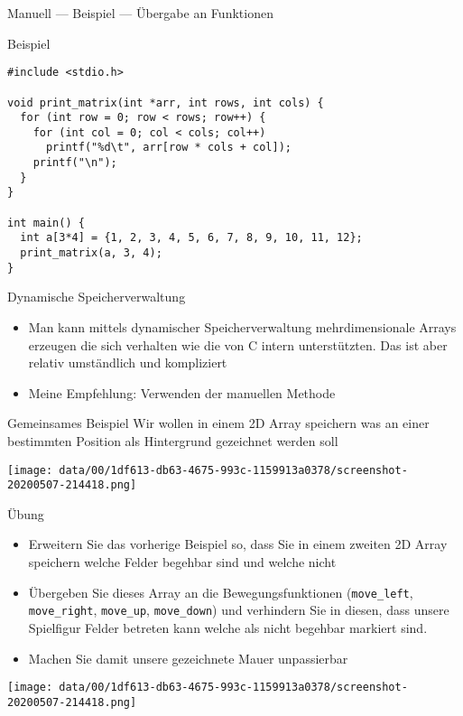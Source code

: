 \documentclass[presentation]{beamer}
\begin{document}
\begin{frame}[label={sec:org5850dae},fragile]{Manuell --- Beispiel --- Übergabe an Funktionen}
 \begin{block}{Beispiel}
\begin{verbatim}
#include <stdio.h>

void print_matrix(int *arr, int rows, int cols) {
  for (int row = 0; row < rows; row++) {
    for (int col = 0; col < cols; col++)
      printf("%d\t", arr[row * cols + col]);
    printf("\n");
  }
}

int main() {
  int a[3*4] = {1, 2, 3, 4, 5, 6, 7, 8, 9, 10, 11, 12};
  print_matrix(a, 3, 4);
}
\end{verbatim}
\end{block}
\end{frame}

\begin{frame}[label={sec:orgde08fb1}]{Dynamische Speicherverwaltung}
\begin{itemize}
\item Man kann mittels dynamischer Speicherverwaltung mehrdimensionale
Arrays erzeugen die sich verhalten wie die von C intern
unterstützten. Das ist aber relativ umständlich und kompliziert
\item Meine Empfehlung: \alert{Verwenden der manuellen Methode}
\end{itemize}
\end{frame}
\begin{frame}[label={sec:org3e4d9f4}]{Gemeinsames Beispiel}
Wir wollen in einem 2D Array speichern was an einer bestimmten
Position als Hintergrund gezeichnet werden soll
\begin{center}
\texttt{[image: data/00/1df613-db63-4675-993c-1159913a0378/screenshot-20200507-214418.png]}
\end{center}
\end{frame}
\begin{frame}[label={sec:orgc4ef52c},fragile]{Übung}
 \begin{itemize}
\item Erweitern Sie das vorherige Beispiel so, dass Sie in einem zweiten
2D Array speichern welche Felder begehbar sind und welche nicht
\item Übergeben Sie dieses Array an die Bewegungsfunktionen ({\color{solarizedYellow}\verb!move_left!},
{\color{solarizedYellow}\verb!move_right!}, {\color{solarizedYellow}\verb!move_up!}, {\color{solarizedYellow}\verb!move_down!}) und verhindern Sie in diesen,
dass unsere Spielfigur Felder betreten kann welche als nicht
begehbar markiert sind.
\item Machen Sie damit unsere gezeichnete Mauer unpassierbar
\end{itemize}
\begin{center}
\texttt{[image: data/00/1df613-db63-4675-993c-1159913a0378/screenshot-20200507-214418.png]}
\end{center}
\end{frame}
\end{document}
